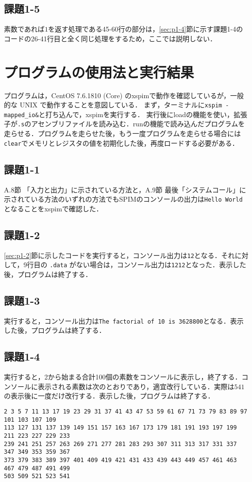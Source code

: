 \subsection{課題1-5}
素数であれば$1$を返す処理である45-60行の部分は，\ref{sec:p1-4}節に示す課題1-4のコードの26-41行目と全く同じ処理をするため，ここでは説明しない．


\section{プログラムの使用法と実行結果}\label{sec:howresult}

プログラムは，CentOS 7.6.1810 (Core) のxspimで動作を確認しているが，一般的な UNIX で動作することを意図している．
まず，ターミナルに\verb|xspim -mapped_io&|と打ち込んで，xspimを実行する．
実行後にloadの機能を使い，拡張子が\verb|.s|のアセンブリファイルを読み込む．runの機能で読み込んだプログラムを走らせる．プログラムを走らせた後，もう一度プログラムを走らせる場合には\verb|clear|でメモリとレジスタの値を初期化した後，再度ロードする必要がある．

\subsection{課題1-1}
A.8節 「入力と出力」に示されている方法と，A.9節 最後「システムコール」に示されている方法のいずれの方法でもSPIMのコンソールの出力は\verb|Hello World|となることをxspimで確認した．
\subsection{課題1-2}
\ref{sec:p1-2}節に示したコードを実行すると，コンソール出力は\verb|12|となる．それに対して，9行目の \verb|.data| がない場合は，コンソール出力は\verb|1212|となった．表示した後，プログラムは終了する．

\subsection{課題1-3}
実行すると，コンソール出力は\verb|The factorial of 10 is 3628800|となる．表示した後，プログラムは終了する．

\subsection{課題1-4}
実行すると，2から始まる合計100個の素数をコンソールに表示し，終了する．コンソールに表示される素数は次のとおりであり，適宜改行している．実際は$541$の表示後に一度だけ改行する．表示した後，プログラムは終了する．
\begin{verbatim}
2 3 5 7 11 13 17 19 23 29 31 37 41 43 47 53 59 61 67 71 73 79 83 89 97 101 103 107 109
113 127 131 137 139 149 151 157 163 167 173 179 181 191 193 197 199 211 223 227 229 233
239 241 251 257 263 269 271 277 281 283 293 307 311 313 317 331 337 347 349 353 359 367
373 379 383 389 397 401 409 419 421 431 433 439 443 449 457 461 463 467 479 487 491 499
503 509 521 523 541 
\end{verbatim}

